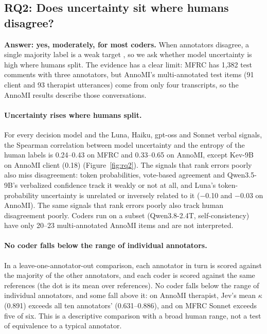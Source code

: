 


\FloatBarrier
\subsection{RQ2: Does uncertainty sit where humans disagree?}
\label{sec:rq2}

\textbf{Answer: yes, moderately, for most coders.} When annotators disagree, a single majority label is a weak target
\citep{plank2022problem,baan2022stop}, so we ask whether model uncertainty is high where humans split. The evidence has a
clear limit: MFRC has 1,382 test comments with three annotators, but AnnoMI's multi-annotated test items (91 client and 93
therapist utterances) come from only four transcripts, so the AnnoMI results describe those conversations.

\paragraph{Uncertainty rises where humans split.} For every decision model and the Luna, Haiku, gpt-oss and Sonnet verbal
signals, the Spearman correlation between model uncertainty and the entropy of the human labels is 0.24--0.43 on MFRC and
0.33--0.65 on AnnoMI, except Kev-9B on AnnoMI client (0.18) (Figure~\ref{fig:rq2}). The signals that rank errors poorly also
miss disagreement: token probabilities, vote-based agreement and Qwen3.5-9B's verbalized confidence track it weakly or not at
all, and Luna's token-probability uncertainty is unrelated or inversely related to it ($-$0.10 and $-$0.03 on AnnoMI). The
same signals that rank errors poorly also track human disagreement poorly.
Coders run on a subset (Qwen3.8-2.4T, self-consistency) have only 20--23 multi-annotated AnnoMI items and are not
interpreted.

\paragraph{No coder falls below the range of individual annotators.} In a leave-one-annotator-out comparison, each annotator
in turn is scored against the majority of the other annotators, and each coder is scored against the same references (the dot
is its mean over references). No coder falls below the range of individual annotators, and some fall above it: on AnnoMI
therapist, Jev's mean $\kappa$ (0.891) exceeds all ten annotators' (0.631--0.886), and on MFRC Sonnet exceeds five of six.
This is a descriptive comparison with a broad human range, not a test of equivalence to a typical annotator.

